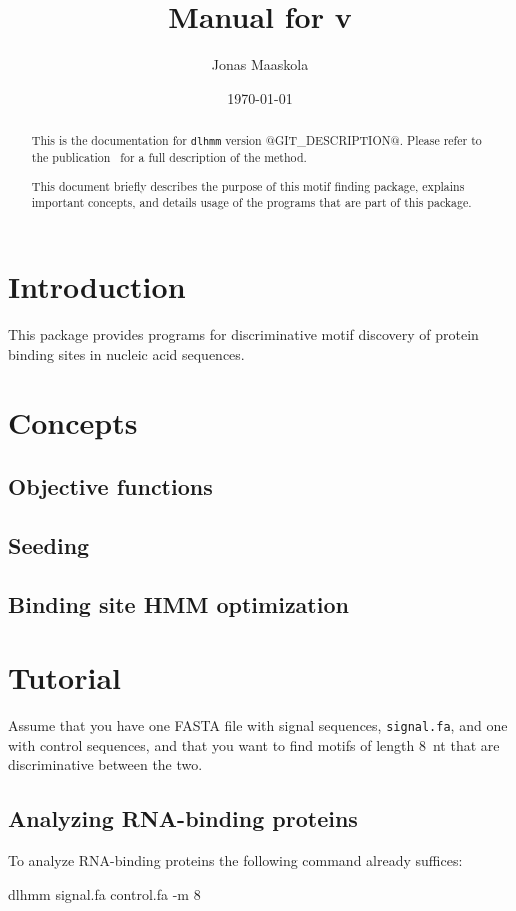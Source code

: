 \documentclass[a4paper]{article}
\title{Manual for \dlhmm{} v\version{}}
\author{Jonas Maaskola}
\date{\today}
\makeatletter
\newcommand{\dlhmm}[0]{\texttt{dlhmm}}
\newcommand{\version}[0]{@GIT_DESCRIPTION@}
\makeatother
\begin{document}
\maketitle

\begin{abstract}
  This is the documentation for \dlhmm{} version \version{}.
  Please refer to the publication~\cite{Maaskola2013} for a full description of the method.

  This document briefly describes the purpose of this motif finding package, explains important concepts, and details usage of the programs that are part of this package.
\end{abstract}

\tableofcontents

\section{Introduction}
This package provides programs for discriminative motif discovery of protein binding sites in nucleic acid sequences.

\section{Concepts}
\subsection{Objective functions}
\subsection{Seeding}
\subsection{Binding site HMM optimization}

\section{Tutorial}
Assume that you have one FASTA file with signal sequences, \verb|signal.fa|, and one with control sequences, and that you want to find motifs of length 8~nt that are discriminative between the two.
\subsection{Analyzing RNA-binding proteins}
To analyze RNA-binding proteins the following command already suffices:\\
\begin{verbbox}
dlhmm signal.fa control.fa -m 8
\end{verbbox}
\fbox{\theverbbox[t]}
\end{document}
